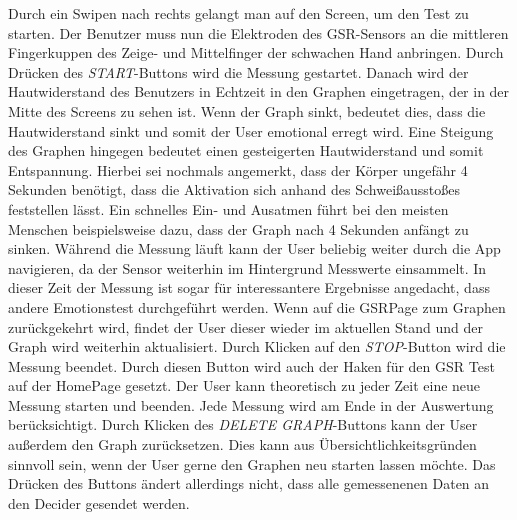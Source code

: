 Durch ein Swipen nach rechts gelangt man auf den Screen, um den Test zu starten. Der Benutzer muss nun die Elektroden des GSR-Sensors an die mittleren Fingerkuppen des Zeige- und Mittelfinger der schwachen Hand anbringen. Durch Drücken des \textit{START}-Buttons wird die Messung gestartet. Danach wird der Hautwiderstand des Benutzers in Echtzeit in den Graphen eingetragen, der in der Mitte des Screens zu sehen ist. Wenn der Graph sinkt, bedeutet dies, dass die Hautwiderstand sinkt und somit der User emotional erregt wird. Eine Steigung des Graphen hingegen bedeutet einen gesteigerten Hautwiderstand und somit Entspannung. Hierbei sei nochmals angemerkt, dass der Körper ungefähr 4 Sekunden benötigt, dass die Aktivation sich anhand des Schweißausstoßes feststellen lässt. Ein schnelles Ein- und Ausatmen führt bei den meisten Menschen beispielsweise dazu, dass der Graph nach 4 Sekunden anfängt zu sinken. \newline
Während die Messung läuft kann der User beliebig weiter durch die App navigieren, da der Sensor weiterhin im Hintergrund Messwerte einsammelt. In dieser Zeit der Messung ist sogar für interessantere Ergebnisse angedacht, dass andere Emotionstest durchgeführt werden. Wenn auf die GSRPage zum Graphen zurückgekehrt wird, findet der User dieser wieder im aktuellen Stand und der Graph wird weiterhin aktualisiert. Durch Klicken auf den \textit{STOP}-Button wird die Messung beendet. Durch diesen Button wird auch der Haken für den GSR Test auf der HomePage gesetzt. Der User kann theoretisch zu jeder Zeit eine neue Messung starten und beenden. Jede Messung wird am Ende in der Auswertung berücksichtigt. \newline
Durch Klicken des \textit{DELETE GRAPH}-Buttons kann der User außerdem den Graph zurücksetzen. Dies kann aus Übersichtlichkeitsgründen sinnvoll sein, wenn der User gerne den Graphen neu starten lassen möchte. Das Drücken des Buttons ändert allerdings nicht, dass alle gemessenenen Daten an den Decider gesendet werden.
